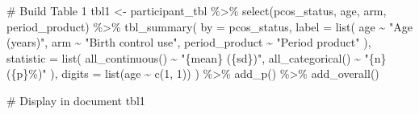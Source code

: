 \documentclass[
  letterpaper,
  DIV=11,
  numbers=noendperiod]{scrartcl}
\newenvironment{Shaded}{\begin{snugshade}}{\end{snugshade}}
\newcommand{\AttributeTok}[1]{\textcolor[rgb]{0.40,0.45,0.13}{#1}}
\newcommand{\CommentTok}[1]{\textcolor[rgb]{0.37,0.37,0.37}{#1}}
\newcommand{\DecValTok}[1]{\textcolor[rgb]{0.68,0.00,0.00}{#1}}
\newcommand{\FunctionTok}[1]{\textcolor[rgb]{0.28,0.35,0.67}{#1}}
\newcommand{\NormalTok}[1]{\textcolor[rgb]{0.00,0.23,0.31}{#1}}
\newcommand{\OtherTok}[1]{\textcolor[rgb]{0.00,0.23,0.31}{#1}}
\newcommand{\SpecialCharTok}[1]{\textcolor[rgb]{0.37,0.37,0.37}{#1}}
\newcommand{\StringTok}[1]{\textcolor[rgb]{0.13,0.47,0.30}{#1}}
\begin{document}
\begin{Shaded}
\begin{Highlighting}[]
\CommentTok{\# Build Table 1}
\NormalTok{tbl1 }\OtherTok{\textless{}{-}}\NormalTok{ participant\_tbl }\SpecialCharTok{\%\textgreater{}\%}
  \FunctionTok{select}\NormalTok{(pcos\_status, age, arm, period\_product) }\SpecialCharTok{\%\textgreater{}\%}
  \FunctionTok{tbl\_summary}\NormalTok{(}
    \AttributeTok{by =}\NormalTok{ pcos\_status,}
    \AttributeTok{label =} \FunctionTok{list}\NormalTok{(}
\NormalTok{      age }\SpecialCharTok{\textasciitilde{}} \StringTok{"Age (years)"}\NormalTok{,}
\NormalTok{      arm }\SpecialCharTok{\textasciitilde{}} \StringTok{"Birth control use"}\NormalTok{,}
\NormalTok{      period\_product }\SpecialCharTok{\textasciitilde{}} \StringTok{"Period product"}
\NormalTok{    ),}
    \AttributeTok{statistic =} \FunctionTok{list}\NormalTok{(}
      \FunctionTok{all\_continuous}\NormalTok{() }\SpecialCharTok{\textasciitilde{}} \StringTok{"\{mean\} (\{sd\})"}\NormalTok{,}
      \FunctionTok{all\_categorical}\NormalTok{() }\SpecialCharTok{\textasciitilde{}} \StringTok{"\{n\} (\{p\}\%)"}
\NormalTok{    ),}
    \AttributeTok{digits =} \FunctionTok{list}\NormalTok{(age }\SpecialCharTok{\textasciitilde{}} \FunctionTok{c}\NormalTok{(}\DecValTok{1}\NormalTok{, }\DecValTok{1}\NormalTok{))}
\NormalTok{  ) }\SpecialCharTok{\%\textgreater{}\%}
  \FunctionTok{add\_p}\NormalTok{() }\SpecialCharTok{\%\textgreater{}\%}
  \FunctionTok{add\_overall}\NormalTok{()}

\CommentTok{\# Display in document}
\NormalTok{tbl1}
\end{Highlighting}
\end{Shaded}
\end{document}
